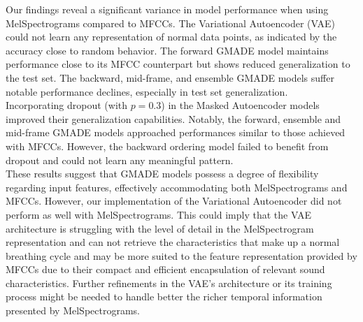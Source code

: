 Our findings reveal a significant variance in model performance when using MelSpectrograms compared to MFCCs. The Variational Autoencoder (VAE) could not learn any representation of normal data points, as indicated by the accuracy close to random behavior. The forward GMADE model maintains performance close to its MFCC counterpart but shows reduced generalization to the test set. The backward, mid-frame, and ensemble GMADE models suffer notable performance declines, especially in test set generalization.\\
Incorporating dropout (with $p=0.3$) in the Masked Autoencoder models improved their generalization capabilities. Notably, the forward, ensemble and mid-frame GMADE models approached performances similar to those achieved with MFCCs. However, the backward ordering model failed to benefit from dropout and could not learn any meaningful pattern.\\
These results suggest that GMADE models possess a degree of flexibility regarding input features, effectively accommodating both MelSpectrograms and MFCCs. However, our implementation of the Variational Autoencoder did not perform as well with MelSpectrograms. This could imply that the VAE architecture is struggling with the level of detail in the MelSpectrogram representation and can not retrieve the characteristics that make up a normal breathing cycle and may be more suited to the feature representation provided by MFCCs due to their compact and efficient encapsulation of relevant sound characteristics. Further refinements in the VAE's architecture or its training process might be needed to handle better the richer temporal information presented by MelSpectrograms.

